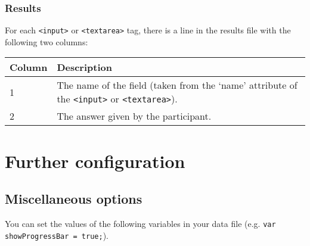 \documentclass[11pt,letterpaper]{article}
\begin{document}
\subsubsection*{Results}

For each \texttt{<input>} or \texttt{<textarea>} tag, there is a line in the results file with the
following two columns:



\footnotesize
\begin{RaggedRight}
\sloppy
\begin{tabular}{|p{1.1384in}|p{4.3616in}|}
\hline
 \textbf{Column}  &  \textbf{Description} \\
\hline
 1         &  The name of the field (taken from the `name' attribute of the \texttt{<input>} or \texttt{<textarea>}). \\
\hline
 2         &  The answer given by the participant. 
\\\hline
\end{tabular}
\end{RaggedRight}
\fussy

\normalsize

\section{Further configuration}

\subsection{Miscellaneous  options}

You can set the values of the following variables in your data file (e.g. \texttt{var showProgressBar = true;}).
\end{document}
